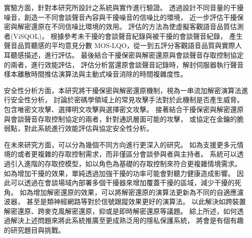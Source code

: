     實驗方面，針對本研究所設計之系統與實作進行驗證。
透過設計不同音量的干擾噪音，創造一不同會談聲音內容與干擾噪音的信噪比的環境，
近一步評估干擾保密與解密還原在不同信噪比環境的效用。
評估的方法為使虛擬客觀語音品質估測者(ViSQOL)，
根據參考未干擾的會談聲音紀錄與被干擾的會談聲音紀錄，
產生聲音品質聽感的平均意見分數 MOS-LQO，從一到五評分客觀語音品質與實際人耳聽感描述，進行評估。
最後結合干擾保密與解密還原與會談聲音存取控制協定的兩者，進行效能評估，
評估分析當還原會談聲音記錄時，解封伺服器執行聲音樣本離散時間推估演算法與主動式噪音消除的時間複雜度性。

    安全性分析方面，本研究將干擾保密與解密還原機制，視為一串流加解密演算法進行安全性分析，
討論於密碼學領域上的常見攻擊手法對於此機制是否產生威脅。
包含唯密文攻擊、選擇明文攻擊與選擇密文攻擊。
接著結合干擾保密與解密還原與會談聲音存取控制協定的兩者，針對通訊層面可能的攻擊，
或協定在金鑰的脆弱點，對此系統進行效能評估與協定安全性分析。

    在未來研究方面，可以分為幾個不同方向進行更深入的研究。
如為支援更多元情境的或者更複雜的存取控制需求，而非僅區分會談參與者與主持者。
系統可以透過引入進階的存取控模型，如以角色為基礎的存取控制來符合更複雜情境需求。
如為增加干擾的效果，單純透過加強干擾的功率可能會對聽力健康造成影響。
因此可以透過在會談場域內部署多個干擾器來增加覆蓋干擾的區域，減少干擾的死角。
如為增加解密還原的效果，可以將解密還原的演算法更新為不同的自適應濾波器，
甚至是類神經網路等對於信號跟蹤效果更好的演算法。
以此解決如跨裝置解密還原、跨麥克風解密還原，抑或是即時解密還原等議題。
綜上所述，如何透過解決上述問題來將此系統推廣至更成熟泛用的隱私保護系統，
將會是有個有趣的研究題目與挑戰。